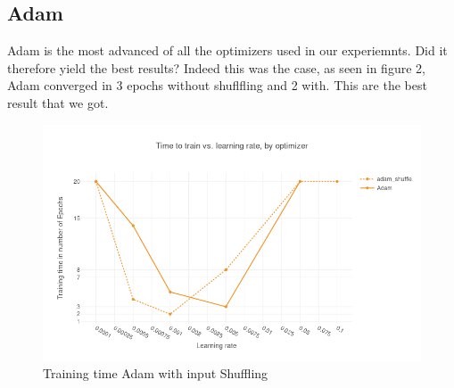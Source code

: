 \subsection{Adam}
Adam is the most advanced of all the optimizers used in our experiemnts. Did it therefore yield the best results? Indeed this was the case, as seen in figure 2, Adam converged in 3 epochs without shuflfling and 2 with. This are the best result that we got. 
\begin{figure}[H]
    \centering
			\includegraphics[scale=0.45]{images/results_adam_shuffle} 
    \caption{Training time Adam with input Shuffling}
    \label{fig:results_adam_shuffle}
\end{figure}